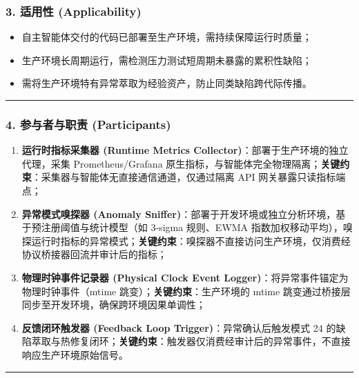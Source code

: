 \subsubsection{3. 适用性
(Applicability)}\label{ux9002ux7528ux6027-applicability-22}

\begin{itemize}
\item
  自主智能体交付的代码已部署至生产环境，需持续保障运行时质量；
\item
  生产环境长周期运行，需检测压力测试短周期未暴露的累积性缺陷；
\item
  需将生产环境特有异常萃取为经验资产，防止同类缺陷跨代际传播。
\end{itemize}

\begin{center}\rule{0.5\linewidth}{0.5pt}\end{center}

\subsubsection{4. 参与者与职责
(Participants)}\label{ux53c2ux4e0eux8005ux4e0eux804cux8d23-participants-22}

\begin{enumerate}
\def\labelenumi{\arabic{enumi}.}
\item
  \textbf{运行时指标采集器 (Runtime Metrics
  Collector)}：部署于生产环境的独立代理，采集 Prometheus/Grafana
  原生指标，与智能体完全物理隔离；\textbf{关键约束}：采集器与智能体无直接通信通道，仅通过隔离
  API 网关暴露只读指标端点；
\item
  \textbf{异常模式嗅探器 (Anomaly
  Sniffer)}：部署于开发环境或独立分析环境，基于预注册阈值与统计模型（如
  3-sigma 规则、EWMA
  指数加权移动平均），嗅探运行时指标的异常模式；\textbf{关键约束}：嗅探器不直接访问生产环境，仅消费经协议桥接器回流并审计后的指标；
\item
  \textbf{物理时钟事件记录器 (Physical Clock Event
  Logger)}：将异常事件锚定为物理时钟事件（mtime
  跳变）；\textbf{关键约束}：生产环境的 mtime
  跳变通过桥接层同步至开发环境，确保跨环境因果单调性；
\item
  \textbf{反馈闭环触发器 (Feedback Loop Trigger)}：异常确认后触发模式 24
  的缺陷萃取与热修复闭环；\textbf{关键约束}：触发器仅消费经审计后的异常事件，不直接响应生产环境原始信号。
\end{enumerate}

\begin{center}\rule{0.5\linewidth}{0.5pt}\end{center}

